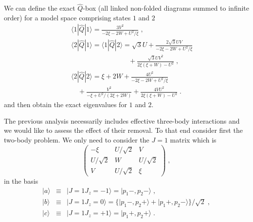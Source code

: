 We can define the exact $\hat{Q}$-box (all linked non-folded diagrams summed to infinite order) 
for a model space comprising states
$1$ and $2$
\begin{eqnarray}
&&\langle1|\hat{Q}|1\rangle=\frac{3V^2}{-2\xi-2W+U^2/\xi}\;,\nonumber\\
&&\langle2|\hat{Q}|1\rangle=\langle1|\hat{Q}|2\rangle=\sqrt{3}U+
\frac{2\sqrt{3}UV}{-2\xi-2W+U^2/\xi}\nonumber\\
&&\qquad\qquad\qquad\qquad\ \ +\frac{\sqrt{3}UV^2}{2\xi(\xi+W)-U^2}
\;,\nonumber\\
&&\langle2|\hat{Q}|2\rangle=\xi+2W+\frac{4U^2}{-2\xi-2W+U^2/\xi}
\nonumber\\
&&\quad+\frac{V^2}{-\xi+U^2/(2\xi+2W)}+\frac{4VU^2}{2\xi(\xi+W)-U^2}\nonumber \;.
\end{eqnarray}
and then obtain the exact eigenvalues  for $1$ and $2$.

The previous analysis necessarily includes effective three-body interactions and we 
would like to assess the effect of their removal. To that end consider first 
the two-body problem. We only need to consider the $J=1$ matrix which is
\[
\left(\begin{array}{ccc}
-\xi&U/\sqrt{2}&V\\
U/\sqrt{2}&W&U/\sqrt{2}\\
V&U/\sqrt{2}&\xi
\end{array}\right)\;, \label{mat33}
\]
in the basis
\begin{eqnarray}
|a\rangle&\equiv&|J=1 J_z=-1\rangle=|p_1-,p_2-\rangle\;,\nonumber\\
|b\rangle&\equiv&|J=1 J_z=0\rangle=\bigl\{|p_1-,p_2+\rangle
+|p_1+,p_2-\rangle\bigr\}/\sqrt{2}\;,\nonumber\\
|c\rangle&\equiv&|J=1 J_z=+1\rangle
=|p_1+,p_2+\rangle\nonumber\;.\label{2basis}
\end{eqnarray}

